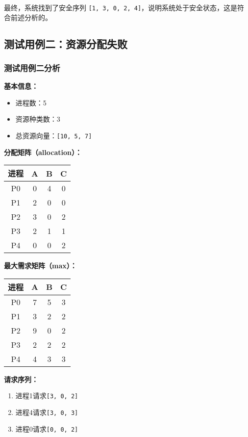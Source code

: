 \documentclass[12pt, a4paper, oneside]{ctexart}
\begin{document}
最终，系统找到了安全序列 \texttt{[1, 3, 0, 2, 4]}，说明系统处于安全状态，这是符合前述分析的。

\subsection{测试用例二：资源分配失败}

\subsubsection{测试用例二分析}

\textbf{基本信息：}
\begin{itemize}
    \item 进程数：5
    \item 资源种类数：3
    \item 总资源向量：\texttt{[10, 5, 7]}
\end{itemize}

\textbf{分配矩阵（allocation）：}
\begin{table}[H]
    \centering
    \begin{tabular}{c|ccc}
        \hline
        进程 & A & B & C \\
        \hline
        P0 & 0 & 4 & 0 \\
        P1 & 2 & 0 & 0 \\
        P2 & 3 & 0 & 2 \\
        P3 & 2 & 1 & 1 \\
        P4 & 0 & 0 & 2 \\
        \hline
    \end{tabular}
\end{table}

\textbf{最大需求矩阵（max）：}
\begin{table}[H]
    \centering
    \begin{tabular}{c|ccc}
        \hline
        进程 & A & B & C \\
        \hline
        P0 & 7 & 5 & 3 \\
        P1 & 3 & 2 & 2 \\
        P2 & 9 & 0 & 2 \\
        P3 & 2 & 2 & 2 \\
        P4 & 4 & 3 & 3 \\
        \hline
    \end{tabular}
\end{table}

\textbf{请求序列：}
\begin{enumerate}
    \item 进程1请求\texttt{[3, 0, 2]}
    \item 进程4请求\texttt{[3, 0, 3]}
    \item 进程0请求\texttt{[0, 0, 2]}
\end{enumerate}
\end{document}
